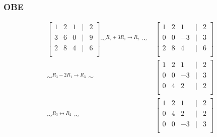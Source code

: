 \documentclass{beamer}
\begin{document}

\begin{frame}
\frametitle{OBE}
\begin{equation}
\begin{split}
\begin{bmatrix}
	1 & 2 & 1 & | & 2\\
	3 & 6 & 0& | & 9\\
	2 & 8 & 4 & | & 6\\
	\end{bmatrix} \sim^{R_2+3R_1 \rightarrow R_2}\sim 
&\begin{bmatrix}
	1 & 2 & 1 &| &2\\
	0 & 0 & -3&| &3\\
	2 & 8 & 4&| &6\\
\end{bmatrix}
\\\sim^{R_3-2R_1 \rightarrow R_3}\sim 
&\begin{bmatrix}
	1 & 2 & 1 &| &2\\
	0 & 0 & -3&| &3\\
	0 & 4 & 2&| &2\\
\end{bmatrix}
\\\sim^{R_3\leftrightarrow R_2}\sim 
&\begin{bmatrix}
	1 & 2 & 1 &| &2\\
	0 & 4 & 2&| &2\\
	0 & 0 & -3&| &3\\
\end{bmatrix}
\end{split}
\nonumber
\end{equation}

\end{frame}

\end{document}

